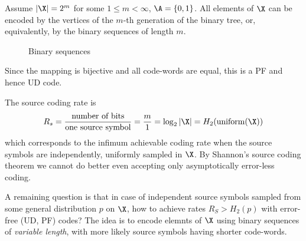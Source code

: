\documentclass[toc, titlepaged]{../cs-classes/cs-classes}
\begin{document}
\begin{example}
    Assume $|\X|=2^m$ for some $1\leq m<\infty$, $\A=\{0, 1\}$. All elements of $\X$ can be encoded by the vertices of the $m$-th generation of the binary tree, or, equivalently, by the binary sequences of length $m$.

    \begin{figure}[!ht]
        \center
        \caption{Binary sequences}
    \end{figure}

    Since the mapping is bijective and all code-words are equal, this is a PF and hence UD code.

    The source coding rate is
    \begin{equation*}
        R_s=\frac{\textnormal{number of bits}}{\textnormal{one source symbol}} = \frac{m}{1} = \log_2|\X| = H_2(\textnormal{uniform}(\X))
    \end{equation*}
    which corresponds to the infimum achievable coding rate when the source symbols are independently, uniformly sampled in $\X$. By Shannon's source coding theorem we cannot do better even accepting only asymptotically error-less coding.
\end{example}

A remaining question is that in case of independent source symbols sampled from some general distribution $p$ on $\X$, how to achieve rates $R_S>H_2(p)$ with error-free (UD, PF) codes? The idea is to encode elemnts of $\X$ using binary sequences of \emph{variable length}, with more likely source symbols having shorter code-words.
\end{document}
